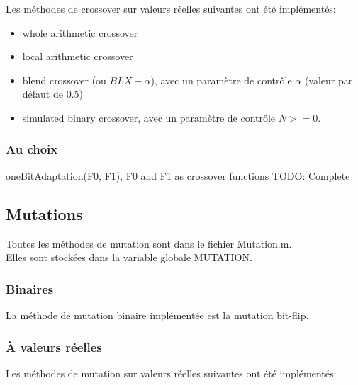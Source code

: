 \documentclass[12pt, letterpaper]{article}
\begin{document}
Les méthodes de crossover sur valeurs réelles suivantes ont été implémentés:

\begin{itemize}
\item whole arithmetic crossover\\
  
\item local arithmetic crossover\\
  
\item blend crossover (ou $BLX-\alpha$), avec un paramètre de contrôle
  $\alpha$ (valeur par défaut de 0.5)\\
  
\item simulated binary crossover, avec un paramètre de contrôle $N >= 0$.\\
\end{itemize}


\subsubsection{Au choix}

oneBitAdaptation(F0, F1), F0 and F1 as crossover functions
TODO: Complete

\subsection{Mutations}

Toutes les méthodes de mutation sont dans le fichier Mutation.m.\\
Elles sont stockées dans la variable globale MUTATION.

\subsubsection{Binaires}

La méthode de mutation binaire implémentée est la mutation bit-flip.

\subsubsection{À valeurs réelles}

Les méthodes de mutation sur valeurs réelles suivantes ont été implémentés:
\end{document}
